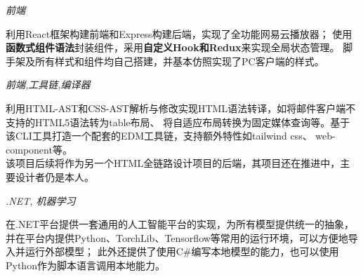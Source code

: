 \documentclass{uniquecv}
\begin{document}
\textit{前端}
\vspace{0.4ex}
 
利用React框架构建前端和Express构建后端，实现了全功能网易云播放器；
使用\textbf{函数式组件语法}封装组件，采用\textbf{自定义Hook和Redux}来实现全局状态管理。
脚手架及所有样式和组件均自己搭建，并基本仿照实现了PC客户端的样式。

\textit{前端,工具链,编译器}
\vspace{0.4ex}

利用HTML-AST和CSS-AST解析与修改实现HTML语法转译，如将邮件客户端不支持的HTML5语法转为table布局、
将自适应布局转换为固定媒体查询等。基于该CLI工具打造一个配套的EDM工具链，支持额外特性如tailwind css、
web-component等。
\\
该项目后续将作为另一个HTML全链路设计项目的后端，其项目还在推进中，主要设计者仍是本人。




\textit{.NET, 机器学习}
\vspace{0.4ex}

在.NET平台提供一套通用的人工智能平台的实现，为所有模型提供统一的抽象，
并在平台内提供Python、TorchLib、Tensorflow等常用的运行环境，可以方便地导入并运行外部模型；
此外还提供了使用C\#编写本地模型的能力，也可以使用Python作为脚本语言调用本地能力。



\end{document}
